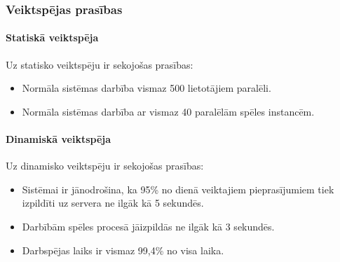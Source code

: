 \subsubsection{Veiktspējas prasības}

\paragraph{Statiskā veiktspēja}

Uz statisko veiktspēju ir sekojošas prasības:

\begin{itemize}
	\item Normāla sistēmas darbība vismaz 500 lietotājiem paralēli.
	\item Normāla sistēmas darbība ar vismaz 40 paralēlām spēles instancēm.
\end{itemize}

\paragraph{Dinamiskā veiktspēja}

Uz dinamisko veiktspēju ir sekojošas prasības:

\begin{itemize}
	\item Sistēmai ir jānodrošina, ka 95\% no dienā veiktajiem pieprasījumiem tiek izpildīti uz servera ne ilgāk kā 5 sekundēs.
	\item Darbībām spēles procesā jāizpildās ne ilgāk kā 3 sekundēs.
	\item Darbspējas laiks ir vismaz 99,4\% no visa laika.
\end{itemize}
